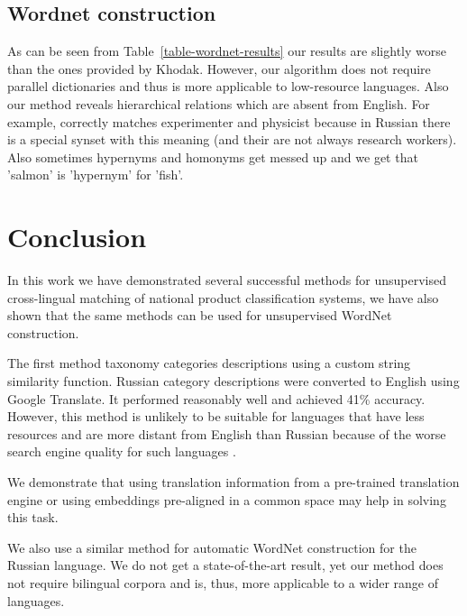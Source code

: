 \documentclass[11pt,a4paper]{article}
\begin{document}
\subsection{Wordnet construction}



As can be seen from Table~\ref{table-wordnet-results} our results are slightly worse than the ones provided by Khodak. However, our algorithm does not require parallel dictionaries and thus is more applicable to low-resource languages.
Also our method reveals hierarchical relations which are absent from English. For example, correctly matches experimenter and physicist because in Russian there is a special synset with this meaning (and their are not always research workers). Also sometimes hypernyms and homonyms get messed up and we get that 'salmon' is 'hypernym' for 'fish'.

%
%


\section{Conclusion}
In this work we have demonstrated several successful methods for unsupervised cross-lingual matching of national product classification systems, we have also shown that the same methods can be used for unsupervised WordNet construction.

The first method taxonomy categories descriptions using a custom string similarity function. Russian category descriptions were converted to English using Google Translate. It performed reasonably well and achieved 41\% accuracy. However, this method is unlikely to be suitable for languages that have less resources and are more distant from English than Russian because of the worse search engine quality for such languages \cite{google-translate-rare}.


We demonstrate that using translation information from a pre-trained translation engine or using embeddings pre-aligned in a common space may help in solving this task.

We also use a similar method for automatic WordNet construction for the Russian language. We do not get a state-of-the-art result, yet our method does not require bilingual corpora and is, thus, more applicable to a wider range of languages.




\end{document}
